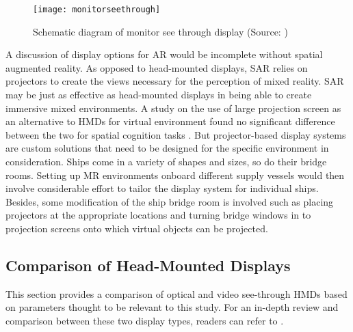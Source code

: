 \begin{figure}
	\centering
	\texttt{[image: monitorseethrough]}
	\caption{Schematic diagram of monitor see through display (Source: \cite{azuma1997survey})}
	\label{fig:monitorseethrough}
\end{figure}

A discussion of display options for AR would be incomplete without spatial augmented reality. As opposed to head-mounted displays, SAR relies on projectors to create the views necessary for the perception of mixed reality. SAR may be just as effective as head-mounted displays in being able to create immersive mixed environments. A study on the use of large projection screen as an alternative to HMDs for virtual environment found no significant difference between the two for spatial cognition tasks \parencite{patrick2000using}. But projector-based display systems are custom solutions that need to be designed for the specific environment in consideration. Ships come in a variety of shapes and sizes, so do their bridge rooms. Setting up MR environments onboard different supply vessels would then involve considerable effort to tailor the display system for individual ships. Besides, some modification of the ship bridge room is involved such as placing projectors at the appropriate locations and turning bridge windows in to projection screens onto which virtual objects can be projected.

\subsection{Comparison of Head-Mounted Displays}
This section provides a comparison of optical and video see-through HMDs based on parameters thought to be relevant to this study. For an in-depth review and comparison between these two display types, readers can refer to \cite{rolland1995comparison}.

